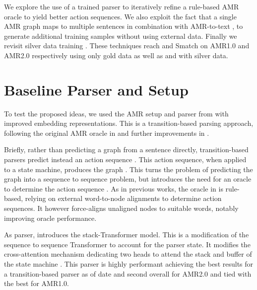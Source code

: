 \documentclass[11pt,a4paper]{article}
\newcommand\crule[3][black]{\textcolor{#1}{\rule{#2}{#3}}}
\begin{document}
We explore the use of a trained parser to iteratively refine a rule-based AMR oracle \cite{ballesteros-al-onaizan-2017-amr,anon2020a} to yield better action sequences. We also exploit the fact that a single AMR graph maps to multiple sentences in combination with AMR-to-text \cite{mager-etal-2020-gpt-too}, to generate additional training samples without using external data. Finally we revisit silver data training \cite{konstas-etal-2017-neural}. These techniques reach  and  Smatch \cite{cai-knight-2013-smatch} on AMR1.0 and AMR2.0 respectively using only gold data as well as  and  with silver data. 
 

\section{Baseline Parser and Setup}
\label{section:baseline}
To test the proposed ideas, we used the AMR setup and parser from \cite{anon2020a} with improved embedding representations. This is a transition-based parsing approach, following the original AMR oracle in \cite{ballesteros-al-onaizan-2017-amr} and further improvements in \cite{naseem-etal-2019-rewarding}.

Briefly, rather than predicting a graph  from a sentence  directly, transition-based parsers predict instead an action sequence . This action sequence, when applied to a state machine, produces the graph . This turns the problem of predicting the graph into a sequence to sequence problem, but introduces the need for an oracle to determine the action sequence . As in previous works, the oracle in \cite{anon2020a} is rule-based, relying on external word-to-node alignments \cite{flanigan2014discriminative,pourdamghani2016generating} to determine action sequences. It however force-aligns unaligned nodes to suitable words, notably improving oracle performance. 

As parser, \cite{anon2020a} introduces the stack-Transformer model. This is a modification of the sequence to sequence Transformer \cite{vaswani2017attention} to account for the parser state. It modifies the cross-attention mechanism dedicating two heads to attend the stack and buffer of the state machine . This parser is highly performant achieving the best results for a transition-based parser as of date and second overall for AMR2.0 and tied with the best for AMR1.0.
\end{document}
